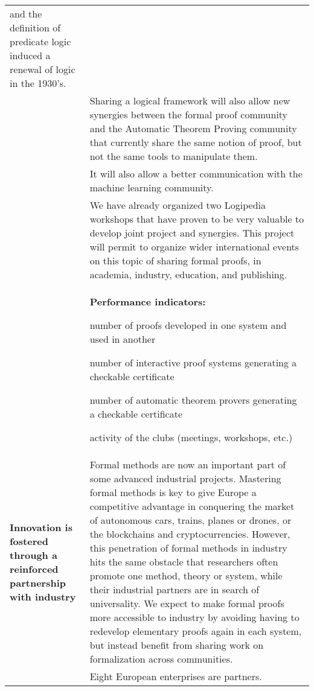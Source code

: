 \begin{longtable}{|p{}|p{}|}
and the definition of predicate logic induced a renewal of logic in
the 1930's.\\
&
\hspace{0.4cm}
Sharing a logical framework will also allow new synergies between the
formal proof community and the Automatic Theorem Proving community
that currently share the same notion of proof, but not the same tools
to manipulate them.
\\
&
\hspace{0.4cm}
It will also allow a better communication with the machine learning community.\\
&
\hspace{0.4cm}
We have already organized two Logipedia workshops that have proven to
be very valuable to develop joint project and synergies.  This project
will permit to organize wider international events on this topic of
sharing formal proofs, in academia, industry, education, and
publishing.\\
&
\colorbox{color2}{\bf Performance indicators:}
\begin{compactitem}
  \item number of proofs developed in one system and used in another
  \item number of interactive proof systems generating a checkable certificate
  \item number of automatic theorem provers generating a checkable certificate 
  \item activity of the clubs (meetings, workshops, etc.)
\end{compactitem}
\\
\hline
{\bf Innovation is fostered through a reinforced partnership
with industry}
&
Formal methods are now an important part of some advanced industrial
projects. Mastering formal methods is key to give Europe a competitive
advantage in conquering the market of autonomous cars, trains, planes
or drones, or the blockchains and cryptocurrencies. However, this
penetration of formal methods in industry hits the same obstacle that
researchers often promote one method, theory or system, while their
industrial partners are in search of universality. We expect to make
formal proofs more accessible to industry by avoiding having to redevelop
elementary proofs again in each system, but instead benefit from
sharing work on formalization across communities.\\
&
\hspace{0.4cm}
Eight European enterprises are partners.

\end{longtable}
